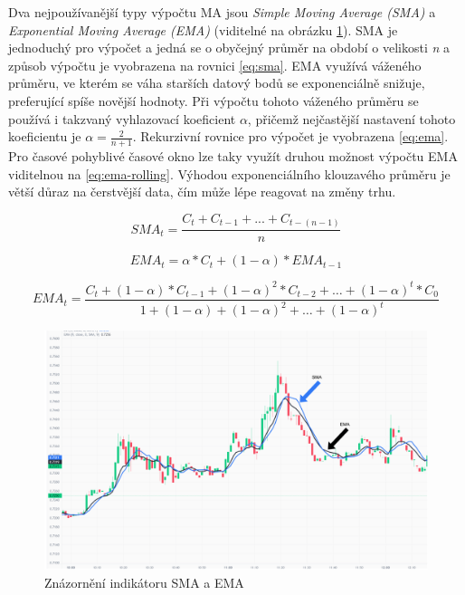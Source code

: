 Dva nejpoužívanější typy výpočtu MA jsou \emph{Simple Moving Average (SMA)} a \emph{Exponential Moving Average (EMA)} (viditelné na obrázku \ref{fig:ma-sma-ema}). SMA je jednoduchý pro výpočet a jedná se o obyčejný průměr na období
o velikosti \emph{n} a způsob výpočtu je vyobrazena na rovnici \ref{eq:sma}. EMA využívá váženého průměru, ve kterém se váha starších datový bodů se exponenciálně snižuje, preferující spíše novější hodnoty.
Při výpočtu tohoto váženého průměru se používá i takzvaný vyhlazovací koeficient $\alpha$, přičemž nejčastější nastavení tohoto koeficientu je $ \alpha = \frac{2}{n+1}$.
Rekurzivní rovnice pro výpočet je vyobrazena \ref{eq:ema}. Pro časové pohyblivé časové okno lze taky využít druhou možnost výpočtu EMA viditelnou na \ref{eq:ema-rolling}.
Výhodou exponenciálního klouzavého průměru je větší důraz na čerstvější data, čím může lépe reagovat na změny trhu.

\begin{equation}
    SMA_t = \frac{C_t + C_{t - 1} + ... + C_{t - (n - 1)}}{n}
    \label{eq:sma}
\end{equation}

\begin{equation}
    EMA_t = \alpha * C_t + (1 - \alpha) * EMA_{t - 1}
    \label{eq:ema}
\end{equation}

\begin{equation}
    EMA_t = \frac{C_t + (1 - \alpha) * C_{t-1} + (1 - \alpha)^2 * C_{t-2} + \ldots + (1 - \alpha)^t * C_0}{1 + (1 - \alpha) + (1 - \alpha)^2 + \ldots + (1 - \alpha)^t}
    \label{eq:ema-rolling}
\end{equation}

\begin{figure}[h]
    \centering
    \includegraphics[width=1\textwidth]{Figures/MA.pdf}
    \caption{Znázornění indikátoru SMA a EMA}
    \label{fig:ma-sma-ema}
\end{figure}

